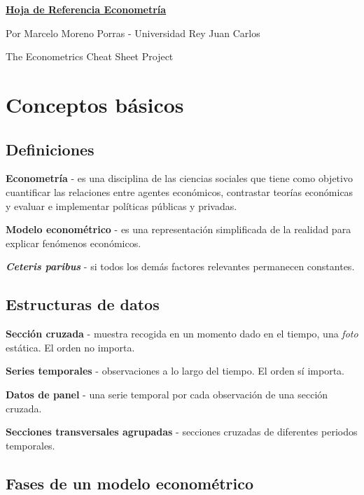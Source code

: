 \documentclass[10pt, a4paper, landscape]{article}
\begin{document}
\begin{multicols}{3}

\begin{center}
	\textbf{\LARGE \href{https://github.com/marcelomijas/econometrics-cheatsheet}{Hoja de Referencia Econometría}}

	{\footnotesize Por Marcelo Moreno Porras - Universidad Rey Juan Carlos}

	{\footnotesize The Econometrics Cheat Sheet Project}
\end{center}

\section*{Conceptos básicos}

\subsection*{Definiciones}

\textbf{Econometría} - es una disciplina de las ciencias sociales que tiene como objetivo cuantificar las relaciones entre agentes económicos, contrastar teorías económicas y evaluar e implementar políticas públicas y privadas.

\textbf{Modelo econométrico} - es una representación simplificada de la realidad para explicar fenómenos económicos.

\textbf{\textsl{Ceteris paribus}} - si todos los demás factores relevantes permanecen constantes.

\subsection*{Estructuras de datos}

\textbf{Sección cruzada} - muestra recogida en un momento dado en el tiempo, una \textsl{foto} estática. El orden no importa.

\textbf{Series temporales} - observaciones a lo largo del tiempo. El orden sí importa.

\textbf{Datos de panel} - una serie temporal por cada observación de una sección cruzada.

\textbf{Secciones transversales agrupadas} - secciones cruzadas de diferentes periodos temporales.

\subsection*{Fases de un modelo econométrico}


\end{multicols}
\end{document}
